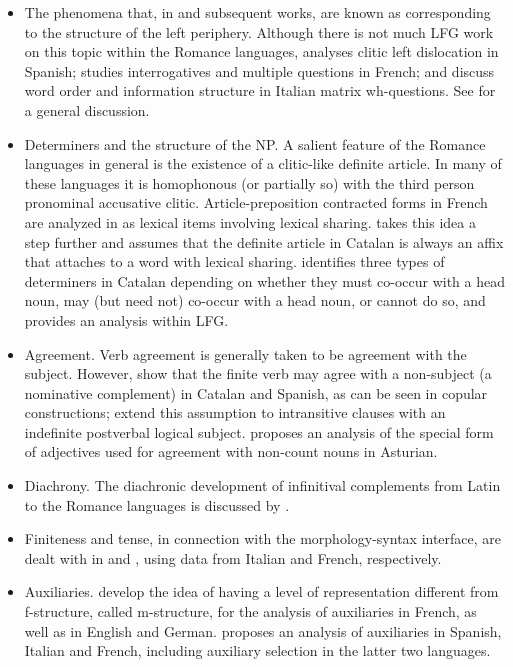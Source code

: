 \documentclass[output=paper,hidelinks]{langscibook}
\begin{document}
\begin{itemize}
\item The phenomena that, in \citet{Rizzi1997} and subsequent works, are known as corresponding to the structure of the left periphery. Although there is not much LFG work on this topic within the Romance languages, \citet{Estigarribia2005,Estigarribia2013} analyses clitic left dislocation in Spanish; \citet{Gazdik2008,Gazdik2010} studies interrogatives and multiple questions in French; and \citet{ZipfQuaglia2017} discuss word order and information structure in Italian matrix wh-questions. See  for a general discussion.
\item Determiners and the structure of the NP. A salient feature of the Romance languages in general is the existence of a clitic-like definite article. In many of these languages it is homophonous (or partially so) with the third person pronominal accusative clitic. Article-preposition contracted forms in French are analyzed in \citet{wescoat2007} as lexical items involving lexical sharing. \citet{Alsina10} takes this idea a step further and assumes that the definite article in Catalan is always an affix that attaches to a word with lexical sharing. \citet{Alsina2011} identifies three types of determiners in Catalan depending on whether they must co-occur with a head noun, may (but need not) co-occur with a head noun, or cannot do so, and provides an analysis within LFG.
\item Agreement. Verb agreement is generally taken to be agreement with the subject. However, \citet{AV:LFG14} show that the finite verb may agree with a non-subject (a nominative complement) in Catalan and Spanish, as can be seen in copular constructions; \citet{AlsinaYang2018} extend this assumption to intransitive clauses with an indefinite postverbal logical subject. \citet{CarreteroGarcia2017} proposes an analysis of the special form of adjectives used for agreement with non-count nouns in Asturian. 
\item Diachrony. The diachronic development of infinitival complements from Latin to the Romance languages is discussed by \citet{Vincent2019}.
\item Finiteness and tense, in connection with the morphology-syntax interface, are dealt with in \citet{Barron2000} and \citet{Schwarze2001a}, using data from Italian and French, respectively. 
\item Auxiliaries. \citet{buttetal96} develop the idea of having a level of representation different from f-structure, called m-structure, for the analysis of auxiliaries in French, as well as in English and German. \citet{Schwarze1996} proposes an analysis of auxiliaries in Spanish, Italian and French, including auxiliary selection in the latter two languages.
\end{itemize}
\end{document}
